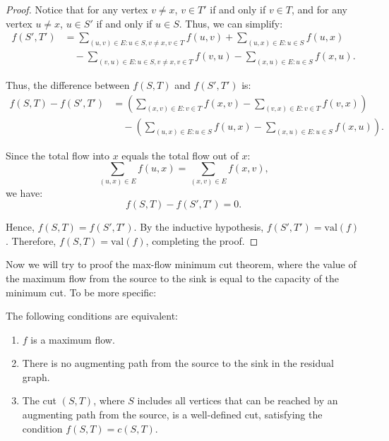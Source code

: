 \begin{proof}
    Notice that for any vertex \( v \neq x \), \( v \in T' \) if and only if \( v \in T \), and for any vertex \( u \neq x \), \( u \in S' \) if and only if \( u \in S \). Thus, we can simplify:
    \begin{align*}
        f(S', T') &= \sum_{(u, v) \in E: u \in S, v \neq x, v \in T} f(u, v) + \sum_{(u, x) \in E: u \in S} f(u, x) \\
        &\quad - \sum_{(v, u) \in E: u \in S, v \neq x, v \in T} f(v, u) - \sum_{(x, u) \in E: u \in S} f(x, u).
    \end{align*}

    Thus, the difference between \( f(S, T) \) and \( f(S', T') \) is:
    \begin{align*}
        f(S, T) - f(S', T') &= \left( \sum_{(x, v) \in E: v \in T} f(x, v) - \sum_{(v, x) \in E: v \in T} f(v, x) \right) \\
        &\quad - \left( \sum_{(u, x) \in E: u \in S} f(u, x) - \sum_{(x, u) \in E: u \in S} f(x, u) \right).
    \end{align*}

    Since the total flow into \( x \) equals the total flow out of \( x \):
    \[
    \sum_{(u, x) \in E} f(u, x) = \sum_{(x, v) \in E} f(x, v),
    \]
    we have:
    \[
    f(S, T) - f(S', T') = 0.
    \]

    Hence, \( f(S, T) = f(S', T') \). By the inductive hypothesis, \( f(S', T') = \mathrm{val}(f) \). Therefore, \( f(S, T) = \mathrm{val}(f) \), completing the proof.
\end{proof}

Now we will try to proof  the max-flow minimum cut theorem, where the value of the maximum flow from the source to the sink is equal to the capacity of the minimum cut. To be more specific:

\begin{theorem}
    The following conditions are equivalent:
    \begin{enumerate}
        \item $f$ is a maximum flow.
        \item There is no augmenting path from the source to the sink in the residual graph.
        \item The cut $(S,T)$, where $S$ includes all vertices that can be reached by an augmenting path from the source, is a well-defined cut, satisfying the condition $f(S,T) = c(S,T)$.
    \end{enumerate}
\end{theorem}

